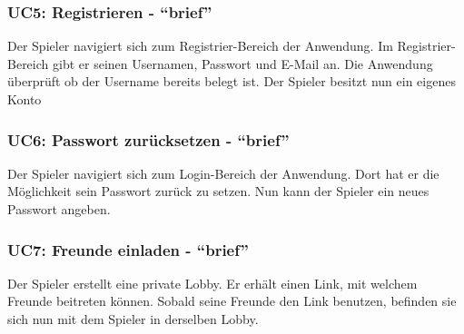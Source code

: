 \documentclass[11pt,ngerman]{article}
\newcommand{\quotes}[1]{``#1''}
\begin{document}
        \subsubsection{UC5: Registrieren - \quotes{brief}}
        \label{sssec:UC5Registrieren}
        \begin{tcolorbox}[enhanced, breakable, sharp corners, width=\dimexpr\textwidth-15mm\relax ,enlarge left by=10mm ,fontupper=\linespread{1.1}\selectfont, boxrule=1pt, title={UC5: Registrieren}, colback=white, colframe=gray!22, coltitle=black]
        	Der Spieler navigiert sich zum Registrier-Bereich der Anwendung. Im Registrier-Bereich gibt er seinen Usernamen, Passwort und E-Mail an.\newline
        	Die Anwendung überprüft ob der Username bereits belegt ist. Der Spieler besitzt nun ein eigenes Konto
        \end{tcolorbox}

        \subsubsection{UC6: Passwort zurücksetzen - \quotes{brief}}
        \label{sssec:UC6Passwortsetzen}
        \begin{tcolorbox}[enhanced, breakable, sharp corners, width=\dimexpr\textwidth-15mm\relax ,enlarge left by=10mm ,fontupper=\linespread{1.1}\selectfont, boxrule=1pt, title={UC6: Passwort zurücksetzen}, colback=white, colframe=gray!22, coltitle=black]
        	Der Spieler navigiert sich zum Login-Bereich der Anwendung. Dort hat er die Möglichkeit sein Passwort zurück zu setzen.\newline
        	Nun kann der Spieler ein neues Passwort angeben.
        \end{tcolorbox}

        \subsubsection{UC7: Freunde einladen - \quotes{brief}}
        \label{sssec:UC7Freundeeinladen}
        \begin{tcolorbox}[enhanced, breakable, sharp corners, width=\dimexpr\textwidth-15mm\relax ,enlarge left by=10mm ,fontupper=\linespread{1.1}\selectfont, boxrule=1pt, title={UC7: Freunde einladen}, colback=white, colframe=gray!22, coltitle=black]
        	Der Spieler erstellt eine private Lobby. Er erhält einen Link, mit welchem Freunde beitreten können.\newline
        	Sobald seine Freunde den Link benutzen, befinden sie sich nun mit dem Spieler in derselben Lobby.
        \end{tcolorbox}
\end{document}
